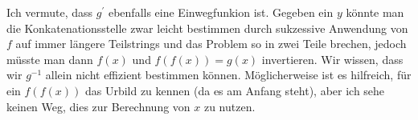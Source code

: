 \documentclass{../crypto}
\begin{document}
Ich vermute, dass $g^\prime$ ebenfalls eine Einwegfunkion ist. Gegeben ein $y$
könnte man die Konkatenationsstelle zwar leicht bestimmen durch sukzessive
Anwendung von $f$ auf immer längere Teilstrings und das Problem so in zwei Teile
brechen, jedoch müsste man dann $f(x)$ und $f(f(x)) = g(x)$ invertieren. Wir
wissen, dass wir $g^{-1}$ allein nicht effizient bestimmen können. Möglicherweise ist
es hilfreich, für ein $f(f(x))$ das Urbild zu kennen (da es am Anfang steht),
aber ich sehe keinen Weg, dies zur Berechnung von $x$ zu nutzen.
\end{document}
